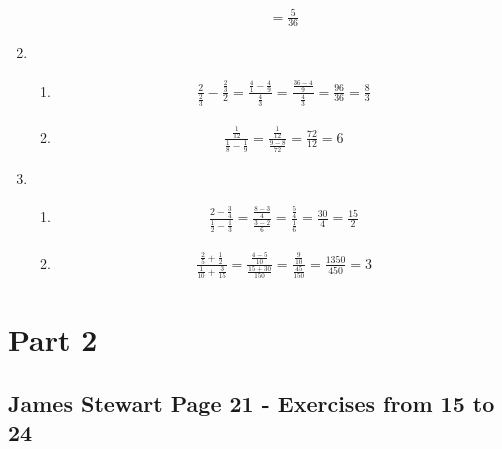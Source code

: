 \documentclass{article}
\begin{document}
\begin{enumerate}
\begin{enumerate}
\begin{align*}
			            = \frac{5}{36}
		            \end{align*}
	      \end{enumerate}
	\item
	      \begin{enumerate}
		      \item
		            \begin{align*}
			            \frac{2}{\frac{2}{3}} - \frac{\frac{2}{3}}{2}
			            = \frac{\frac{4}{1} - \frac{4}{9}}{\frac{4}{3}}
			            = \frac{\frac{36 - 4}{9}}{\frac{4}{3}}
			            = \frac{96}{36}
			            = \frac{8}{3}
		            \end{align*}

		      \item
		            \begin{align*}
			            \frac{\frac{1}{12}}{\frac{1}{8} - \frac{1}{9}}
			            = \frac{\frac{1}{12}}{\frac{9 - 8}{72}}
			            = \frac{72}{12}
			            = 6
		            \end{align*}
	      \end{enumerate}
	\item
	      \begin{enumerate}
		      \item
		            \begin{align*}
			            \frac{2 - \frac{3}{4}}{\frac{1}{2} - \frac{1}{3}}
			            = \frac{\frac{8 - 3}{4}}{\frac{3 - 2}{6}}
			            = \frac{\frac{5}{4}}{\frac{1}{6}}
			            = \frac{30}{4}
			            = \frac{15}{2}
		            \end{align*}
		      \item
		            \begin{align*}
			            \frac{\frac{2}{5} + \frac{1}{2}}{\frac{1}{10} + \frac{3}{15}}
			            = \frac{\frac{4 - 5}{10}}{\frac{15 + 30}{150}}
			            = \frac{\frac{9}{10}}{\frac{45}{150}}
			            = \frac{1350}{450}
			            = 3
		            \end{align*}
	      \end{enumerate}

\end{enumerate}

\section{Part 2}
\subsection{James Stewart Page 21  -  Exercises from 15 to 24}
\end{document}
